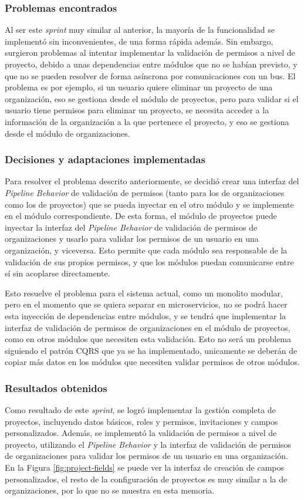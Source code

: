 \subsubsection{Problemas encontrados}
Al ser este \emph{sprint} muy similar al anterior, la mayoría de la funcionalidad se implementó sin inconvenientes, de una forma rápida además. Sin embargo, surgieron problemas al intentar implementar la validación de permisos a nivel de proyecto, debido a unas dependencias entre módulos que no se habían previsto, y que no se pueden resolver de forma asíncrona por comunicaciones con un bus. El problema es por ejemplo, si un usuario quiere eliminar un proyecto de una organización, eso se gestiona desde el módulo de proyectos, pero para validar si el usuario tiene permisos para eliminar un proyecto, se necesita acceder a la información de la organización a la que pertenece el proyecto, y eso se gestiona desde el módulo de organizaciones.

\subsubsection{Decisiones y adaptaciones implementadas}
Para resolver el problema descrito anteriormente, se decidió crear una interfaz del \emph{Pipeline Behavior} de validación de permisos (tanto para los de organizaciones como los de proyectos) que se pueda inyectar en el otro módulo y se implemente en el módulo correspondiente. De esta forma, el módulo de proyectos puede inyectar la interfaz del \emph{Pipeline Behavior} de validación de permisos de organizaciones y usarlo para validar los permisos de un usuario en una organización, y viceversa. Esto permite que cada módulo sea responsable de la validación de sus propios permisos, y que los módulos puedan comunicarse entre sí sin acoplarse directamente.

Esto resuelve el problema para el sistema actual, como un monolito modular, pero en el momento que se quiera separar en microservicios, no se podrá hacer esta inyección de dependencias entre módulos, y se tendrá que implementar la interfaz de validación de permisos de organizaciones en el módulo de proyectos, como en otros módulos que necesiten esta validación. Esto no será un problema siguiendo el patrón \ac{CQRS} que ya se ha implementado, unicamente se deberán de copiar más datos en los módulos que necesiten validar permisos de otros módulos.

\subsubsection{Resultados obtenidos}
Como resultado de este \emph{sprint}, se logró implementar la gestión completa de proyectos, incluyendo datos básicos, roles y permisos, invitaciones y campos personalizados. Además, se implementó la validación de permisos a nivel de proyecto, utilizando el \emph{Pipeline Behavior} y la interfaz de validación de permisos de organizaciones para validar los permisos de un usuario en una organización. En la Figura \ref{fig:project-fields} se puede ver la interfaz de creación de campos personalizados, el resto de la configuración de proyectos es muy similar a la de organizaciones, por lo que no se muestra en esta memoria.

